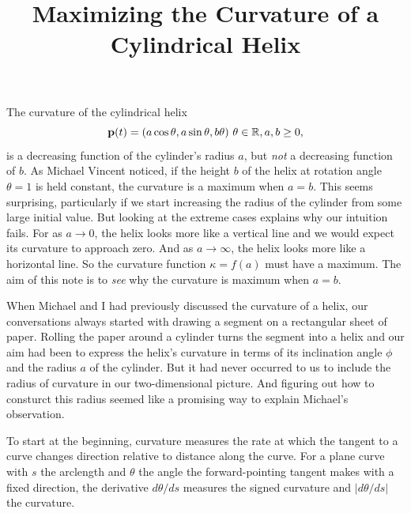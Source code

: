 \documentclass{ximera}
\title{Maximizing the Curvature of a Cylindrical Helix}
\begin{document}
\begin{abstract}
\end{abstract}
\maketitle
 

The curvature of the cylindrical helix
\[
       {\bf p}(t) = (a \cos\theta, a \sin\theta, b\theta) \, \, \theta\in \mathbb{R}, a,b\geq 0,
\]
is a decreasing function of the cylinder's radius $a$, but \emph{not} a decreasing function of $b$. As Michael Vincent noticed, if the height $b$ of the helix at rotation angle $\theta=1$ is held constant, the curvature is a maximum when $a=b$. This seems surprising, particularly if we start increasing the radius of the cylinder from some large initial value. But looking at the extreme cases explains why our intuition fails. For as $a\to 0$, the helix looks more like a vertical line and we would expect its curvature to approach zero. And as $a\to \infty$, the helix looks more like a horizontal line. So the curvature function $\kappa = f(a)$ must have a maximum. The aim of this note is to \emph{see} why the curvature is maximum when $a=b$.

When Michael and I had previously discussed the curvature of a helix, our conversations always started with drawing a segment on a rectangular sheet of paper. Rolling the paper around a cylinder turns the segment into a helix and our aim had been to express the helix's curvature in terms of its inclination angle $\phi$ and the radius $a$ of the cylinder. But it had never occurred to us to include the radius of curvature in our two-dimensional picture. And figuring out how to consturct this radius seemed like a promising way to explain Michael's observation.


To start at the beginning, curvature measures the rate at which the tangent to a curve changes direction relative to distance along the curve. For a plane curve with $s$ the arclength and $\theta$ the angle the forward-pointing tangent makes with a fixed direction, the derivative $d\theta/ds$ measures the signed curvature and $|d\theta/ds|$ the curvature.
\end{document}
